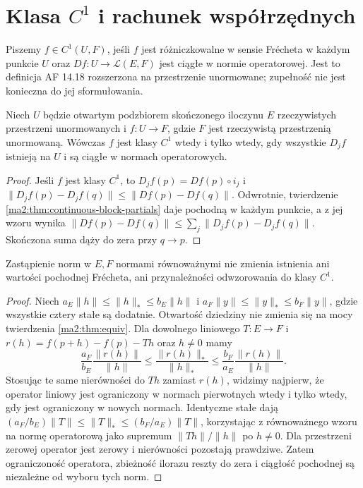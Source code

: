 \section{Klasa \texorpdfstring{$C^1$}{C1} i rachunek współrzędnych}

\begin{definicja}
\label{ma2:def:c1}
Piszemy $f\in C^1(U,F)$, jeśli $f$ jest różniczkowalne
w sensie Frécheta w każdym punkcie $U$ oraz
$Df:U\to\mathcal L(E,F)$ jest ciągłe w normie operatorowej.
Jest to definicja AF 14.18 rozszerzona na przestrzenie
unormowane; zupełność nie jest konieczna do jej
sformułowania.
\end{definicja}

\begin{wniosek}
\label{ma2:cor:c1-blocks}
Niech $U$ będzie otwartym podzbiorem skończonego
iloczynu $E$ rzeczywistych przestrzeni unormowanych
i $f:U\to F$, gdzie $F$ jest rzeczywistą przestrzenią
unormowaną. Wówczas $f$ jest klasy $C^1$ wtedy i tylko wtedy, gdy wszystkie
$D_jf$ istnieją na $U$ i są ciągłe w normach operatorowych.
\end{wniosek}
\begin{proof}
Jeśli $f$ jest klasy $C^1$, to
$D_jf(p)=Df(p)\circ i_j$ i
$\|D_jf(p)-D_jf(q)\|\le\|Df(p)-Df(q)\|$.
Odwrotnie, twierdzenie
\ref{ma2:thm:continuous-block-partials} daje pochodną
w każdym punkcie, a z jej wzoru wynika
$\|Df(p)-Df(q)\|\le\sum_j\|D_jf(p)-D_jf(q)\|$.
Skończona suma dąży do zera przy $q\to p$.
\end{proof}

\begin{stwierdzenie}
\label{ma2:prop:frechet-equivalent-norms}
Zastąpienie norm w $E,F$ normami równoważnymi nie
zmienia istnienia ani wartości pochodnej Frécheta,
ani przynależności odwzorowania do klasy $C^1$.
\end{stwierdzenie}
\begin{proof}
Niech $a_E\|h\|\le\|h\|_*\le b_E\|h\|$
i $a_F\|y\|\le\|y\|_*\le b_F\|y\|$,
gdzie wszystkie cztery stałe są dodatnie.
Otwartość dziedziny nie zmienia się na mocy twierdzenia
\ref{ma2:thm:equiv}. Dla dowolnego liniowego $T:E\to F$ i
$r(h)=f(p+h)-f(p)-Th$ oraz $h\ne0$ mamy
\[
 \frac{a_F}{b_E}\frac{\|r(h)\|}{\|h\|}
 \le\frac{\|r(h)\|_*}{\|h\|_*}
 \le\frac{b_F}{a_E}\frac{\|r(h)\|}{\|h\|}.
\]
Stosując te same nierówności do $Th$ zamiast $r(h)$,
widzimy najpierw, że operator liniowy jest ograniczony
w normach pierwotnych wtedy i tylko wtedy, gdy jest
ograniczony w nowych normach. Identyczne stałe dają
$(a_F/b_E)\|T\|\le\|T\|_*\le(b_F/a_E)\|T\|$,
korzystając z równoważnego wzoru na normę operatorową
jako supremum $\|Th\|/\|h\|$ po $h\ne0$.
Dla przestrzeni zerowej operator jest zerowy i
nierówności pozostają prawdziwe.
Zatem ograniczoność operatora, zbieżność ilorazu
reszty do zera i ciągłość pochodnej są niezależne
od wyboru tych norm.
\end{proof}

